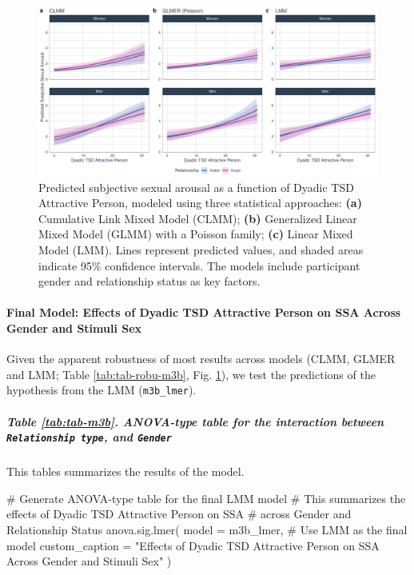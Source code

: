 \documentclass[
  bookmarksnumbered]{article}
\newenvironment{Shaded}{\begin{snugshade}}{\end{snugshade}}
\newcommand{\AttributeTok}[1]{\textcolor[rgb]{0.80,0.80,0.80}{#1}}
\newcommand{\CommentTok}[1]{\textcolor[rgb]{0.50,0.62,0.50}{#1}}
\newcommand{\FunctionTok}[1]{\textcolor[rgb]{0.94,0.94,0.56}{#1}}
\newcommand{\NormalTok}[1]{\textcolor[rgb]{0.80,0.80,0.80}{#1}}
\newcommand{\StringTok}[1]{\textcolor[rgb]{0.80,0.58,0.58}{#1}}
\begin{document}
\begin{figure}
\centering
\includegraphics{Sexual_Desire_Arousal_files/figure-latex/preds-m3b-1.pdf}
\caption{\label{fig:preds-m3b}Predicted subjective sexual arousal as a function of Dyadic TSD Attractive Person, modeled using three statistical approaches: \textbf{(a)} Cumulative Link Mixed Model (CLMM); \textbf{(b)} Generalized Linear Mixed Model (GLMM) with a Poisson family; \textbf{(c)} Linear Mixed Model (LMM). Lines represent predicted values, and shaded areas indicate 95\% confidence intervals. The models include participant gender and relationship status as key factors.}
\end{figure}

\paragraph{Final Model: Effects of Dyadic TSD Attractive Person on SSA Across Gender and Stimuli Sex}\label{final-model-effects-of-dyadic-tsd-attractive-person-on-ssa-across-gender-and-stimuli-sex-1}

Given the apparent robustness of most results across models (CLMM, GLMER and LMM; Table \ref{tab:tab-robu-m3b}, Fig. \ref{fig:preds-m3b}), we test the predictions of the hypothesis from the LMM (\texttt{m3b\_lmer}).

\subparagraph{\texorpdfstring{Table \ref{tab:tab-m3b}. ANOVA-type table for the interaction between \texttt{Relationship\ type}, and \texttt{Gender}}{Table \ref{tab:tab-m3b}. ANOVA-type table for the interaction between Relationship type, and Gender}}\label{table-reftabtab-m3b.-anova-type-table-for-the-interaction-between-relationship-type-and-gender}

This tables summarizes the results of the model.

\begin{Shaded}
\begin{Highlighting}[]
\CommentTok{\# Generate ANOVA{-}type table for the final LMM model}
\CommentTok{\# This summarizes the effects of Dyadic TSD Attractive Person on SSA}
\CommentTok{\# across Gender and Relationship Status}
\FunctionTok{anova.sig.lmer}\NormalTok{(}
  \AttributeTok{model =}\NormalTok{ m3b\_lmer, }\CommentTok{\# Use LMM as the final model}
  \AttributeTok{custom\_caption =} \StringTok{"Effects of Dyadic TSD Attractive Person on SSA }
\StringTok{  Across Gender and Stimuli Sex"}
\NormalTok{)}
\end{Highlighting}
\end{Shaded}
\end{document}
